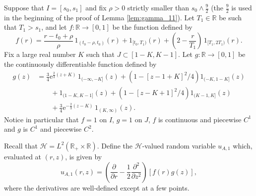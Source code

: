 \documentclass[12pt,a4paper]{article}
\newcommand{\R}{{\mathbb{R}}}
\newcommand{\HH}{\mathcal{H}}
\newcommand{\<}{\langle}
\renewcommand{\>}{\rangle}
\newcommand{\e}{\mathrm{e}}
\begin{document}
Suppose that $I = [s_0, s_1]$ and fix $\rho>0$ strictly smaller than $s_0 \wedge \frac 9 2$ (the $\frac 9 2$ is used in the beginning of the proof of Lemma \ref{lem:gamma_11}).  Let $T_1 \in \R$ be such that $T_1 > s_1$, and
 let  $f:\R\to [0,1]$ be the function defined by 
\begin{equation}\label{rd05_21e1}
     f(r)= \frac{ r-t_0+\rho}{\rho}\, 1_{(t_0 - \rho, t_0)}(r) + 1_{[t_0, T_1)}(r) + (2 - \frac{r}{T_1})\, 1_{[T_1, 2T_1)}(r).
 \end{equation}
  Fix a large real number $K$ such that $J \subset [1-K, K-1]$. Let $g:\R\to [0,1]$  be the continuously differentiable function defined by
 \begin{align} \nonumber
 g(z) &= \frac 34 \e^{\frac 23(z+K)}\, 1_{(-\infty, -K]}(z) + \left(1 - [z-1+K]^2/4 \right) 1_{(-K, 1-K]}(z) \\ \nonumber
    &\qquad + 1_{(1-K, K-1]}(z) + \left(1- [z-K+1]^2/4 \right) 1_{(K-1, K]}(z) \\
    &\qquad + \frac 34\e^{-\frac 23 (z-K)}\, 1_{(K, \infty)}(z).
\label{rd05_21e2}
 \end{align}
 Notice in particular that $f = 1$ on $I$, $g=1$ on $J$, $f$ is continuous and piecewise $C^1$ and $g$ is $C^1$ and piecewise $C^2$.

 Recall that $\HH=L^2(\R_+\times \R)$.
  Define the $\HH$-valued random variable $u_{A,1}$ which, evaluated at $(r,z)$, is given by
 \begin{equation} \label{uA1}
 u_{A,1}(r,z)= \left ( \frac \partial{\partial r} -\frac 12\frac {\partial^2}{\partial z^2} \right)  [f(r)g(z)],
 \end{equation}
 where the derivatives are well-defined except at a few points.
\end{document}
